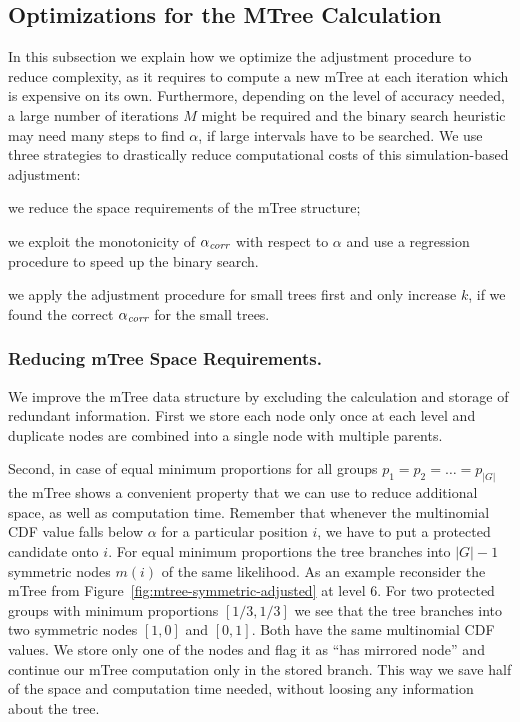 \subsection{Optimizations for the MTree Calculation}
\label{subsec:mtree-optimization}
In this subsection we explain how we optimize the adjustment procedure to reduce complexity, as it requires to compute a new mTree at each iteration which is expensive on its own. 
%
Furthermore, depending on the level of accuracy needed, a large number of iterations $M$ might be required and the binary search heuristic may need many steps to find $\alpha$, if large intervals have to be searched.
%
We use three strategies to drastically reduce computational costs of this simulation-based adjustment:
%
\begin{inparaenum}[(i)]
%
\item we reduce the space requirements of the mTree structure;
%
\item we exploit the monotonicity of $\alpha_\textit{corr}$ with respect to $\alpha$ and use a regression procedure to speed up the binary search.
%
\item we apply the adjustment procedure for small trees first and only increase $k$, if we found the correct  $\alpha_\textit{corr}$ for the small trees.
\end{inparaenum}

\subsubsection{Reducing mTree Space Requirements.} 
\label{subsubsec:reducing-space-requirements}
We improve the mTree data structure by excluding the calculation and storage of redundant information.
%
First we store each node only once at each level and duplicate nodes are combined into a single node with multiple parents.

Second, in case of equal minimum proportions for all groups $p_1 = p_2 = \ldots = p_{|G|}$ the mTree shows a convenient property that we can use to reduce additional space, as well as computation time.
%
Remember that whenever the multinomial CDF value falls below $\alpha$ for a particular position $i$, we have to put a protected candidate onto $i$.
%
For equal minimum proportions the tree branches into $|G| - 1$ symmetric nodes $m(i)$ of the same likelihood.
%
As an example reconsider the mTree from Figure~\ref{fig:mtree-symmetric-adjusted} at level 6.
%
For two protected groups with minimum proportions $[1/3, 1/3]$ we see that the tree branches into two symmetric nodes $[1, 0]$ and $[0,1]$.
%
Both have the same multinomial CDF values.
%
We store only one of the nodes and flag it as ``has mirrored node'' and continue our mTree computation only in the stored branch.
%
This way we save half of the space and computation time needed, without loosing any information about the tree.

